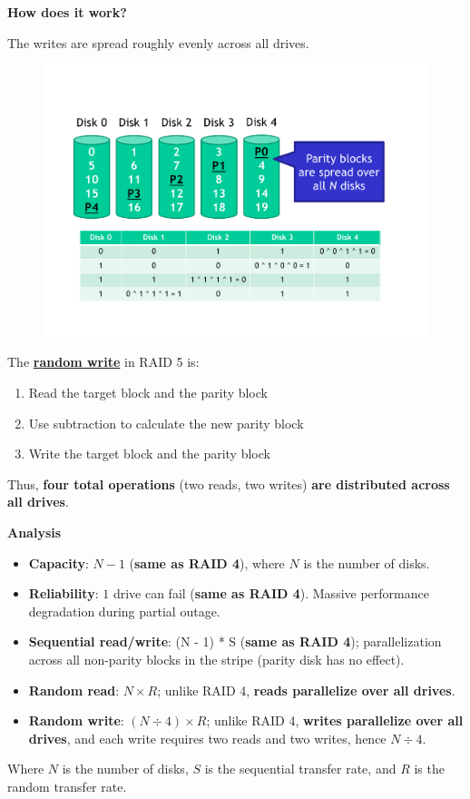 \highspace
\begin{flushleft}
    \textcolor{Green3}{ \textbf{How does it work?}}
\end{flushleft}
The writes are spread roughly evenly across all drives.

\begin{figure}[!htp]
    \centering
    \includegraphics[width=.8\textwidth]{img/raid-9.pdf}
\end{figure}

\noindent
The \textbf{\underline{random write}} in RAID 5 is:
\begin{enumerate}
    \item Read the target block and the parity block
    \item Use subtraction to calculate the new parity block
    \item Write the target block and the parity block
\end{enumerate}
Thus, \textbf{four total operations} (two reads, two writes) \textbf{are distributed across all drives}.

\highspace
\begin{flushleft}
    \textcolor{Green3}{ \textbf{Analysis}}
\end{flushleft}
\begin{itemize}
    \item \textbf{Capacity}: $N - 1$ (\textbf{same as RAID 4}), where $N$ is the number of disks.
    \item \textbf{Reliability}: $1$ drive can fail (\textbf{same as RAID 4}). Massive performance degradation during partial outage.
    \item \textbf{Sequential read/write}: (N - 1) * S (\textbf{same as RAID 4}); parallelization across all non-parity blocks in the stripe (parity disk has no effect).
    \item \textbf{Random read}: $N \times R$; unlike RAID 4, \textbf{reads parallelize over all drives}.
    \item \textbf{Random write}: $\left(N \div 4\right) \times R$; unlike RAID 4, \textbf{writes parallelize over all drives}, and each write requires two reads and two writes, hence $N \div 4$.
\end{itemize}
Where $N$ is the number of disks, $S$ is the sequential transfer rate, and $R$ is the random transfer rate.

